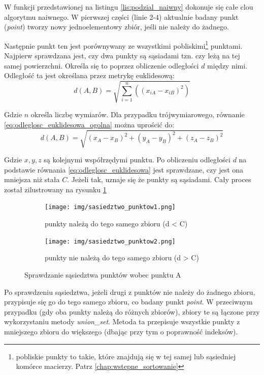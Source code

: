 W funkcji przedstawionej na listingu \ref{lis:podzial_naiwny} dokonuje się całe clou algorytmu naiwnego.
W pierwszej części (linie 2-4) aktualnie badany punkt (\textit{point}) tworzy nowy jednoelementowy zbiór,
jeśli nie należy do żadnego.

Następnie punkt ten jest porównywany ze wszystkimi pobliskimi\footnote{pobliskie punkty to takie,
które znajdują się w tej samej lub sąsiedniej komórce macierzy. Patrz \autoref{chap:wstepne_sortowanie}}
punktami. Najpierw sprawdzana jest, czy dwa punkty są sąsiadami tzn. czy leżą na tej samej powierzchni. 
Określa się to poprzez obliczenie odległości $d$ między nimi. Odległość ta jest określana przez metrykę euklidesową:
\begin{equation} \label{eq:odleglosc_euklidesowa_ogolna}
    d(A,B) = \sqrt{\sum\limits_{i=1}^n((x_{iA}-x_{iB})^2)}
\end{equation}

\noindent Gdzie $n$ określa liczbę wymiarów. Dla przypadku trójwymiarowego, równanie \ref{eq:odleglosc_euklidesowa_ogolna} można uprościć do:
\begin{equation} \label{eq:odleglosc_euklidesowa}
    d(A,B) = \sqrt{(x_A - x_B)^2 + (y_A - y_B)^2 + (z_A - z_B)^2}
\end{equation}

Gdzie $x, y, z$ są kolejnymi współrzędymi punktu. Po obliczeniu odległości $d$ na podstawie równania \ref{eq:odleglosc_euklidesowa}
jest sprawdzane, czy jest ona mniejsza niż stała $C$. Jeżeli tak, uznaje się że punkty są sąsiadami. Cały proces został zilustrowany na
rysunku \ref{fig:sprawdzanie_sasiedztwa}

\begin{figure}[h!]
    \centering
    \begin{subfigure}[b]{0.3\textwidth}
        \texttt{[image: img/sasiedztwo\_punktow1.png]}
        \caption {punkty należą do tego samego zbioru (d < C)}
    \end{subfigure}
    \quad
    \begin{subfigure}[b]{0.3\textwidth}
        \texttt{[image: img/sasiedztwo\_punktow2.png]}
        \caption {punkty nie należą do tego samego zbioru (d > C)}
    \end{subfigure}%
    \caption{Sprawdzanie sąsiedztwa punktów wobec punktu A}
    \label{fig:sprawdzanie_sasiedztwa}
\end{figure}


Po sprawdzeniu sąsiedztwa, jeżeli drugi z punktów nie należy do żadnego zbioru, przypisuje się go do tego samego zbioru, co badany punkt \textit{point}.
W przeciwnym przypadku (gdy oba punkty należą do różnych zbiorów), zbiory te są łączone przy wykorzystaniu metody \textit{union\_set}.
Metoda ta przepisuje wszystkie punkty z mniejszego zbioru do większego (dbając przy tym o poprawność indeksów).

